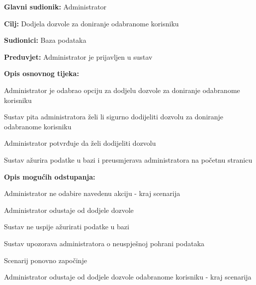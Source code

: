 					\noindent {}
					\begin{packed_item}
	
						\item \textbf{Glavni sudionik: }Administrator
						\item  \textbf{Cilj:} Dodjela dozvole za doniranje odabranome korisniku
						\item  \textbf{Sudionici:} Baza podataka
						\item  \textbf{Preduvjet:} Administrator je prijavljen u sustav
						
						\eject
						
						\item  \textbf{Opis osnovnog tijeka:}
						
						\item[] \begin{packed_enum}
							\item Administrator je odabrao opciju za dodjelu dozvole za doniranje odabranome korisniku
							\item Sustav pita administratora želi li sigurno dodijeliti dozvolu za doniranje odabranome korisniku
							\item Administrator potvrđuje da želi dodijeliti dozvolu
							\item Sustav ažurira podatke u bazi i preusmjerava administratora na početnu stranicu
						\end{packed_enum}

						\item  \textbf{Opis mogućih odstupanja:}

						\item[] \begin{packed_item}
							\item[1.a] Administrator ne odabire navedenu akciju - kraj scenarija
							\item[3.a] Administrator odustaje od dodjele dozvole
							\item[4.a] Sustav ne uspije ažurirati podatke u bazi
							\item[] \begin{packed_enum}
								\item Sustav upozorava administratora o neuspješnoj pohrani podataka
								\item
									\begin{packed_enum}
										\item Scenarij ponovno započinje 
										\item Administrator odustaje od dodjele dozvole odabranome korisniku - kraj scenarija
									\end{packed_enum}
							\end{packed_enum}					
						\end{packed_item}
					\end{packed_item}

